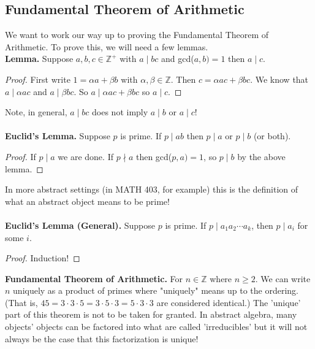 \documentclass[class=article, crop=false]{standalone}
\def\integers{{\mathbb Z}}
\begin{document}
\subsection{Fundamental Theorem of Arithmetic}
We want to work our way up to proving the Fundamental Theorem of Arithmetic. To prove this, we will need a few
lemmas.\\
\textbf{Lemma.} Suppose $a,b,c\in\integers^+$ with $a\mid bc$ and gcd($a,b)=1$ then $a\mid c$.
\begin{proof}
	First write $1=\alpha a+\beta b$ with $\alpha,\beta\in\integers$. Then $c=\alpha ac+ \beta bc$. We know that
	$a\mid \alpha ac$ and $a\mid\beta bc$. So $a\mid\alpha ac+ \beta bc$ so $a\mid c$.
\end{proof}
\noindent Note, in general, $a\mid bc$ does not imply $a\mid b$ or $a\mid c$!\\\\
\textbf{Euclid's Lemma.} Suppose $p$ is prime. If $p\mid ab$ then $p\mid a$ or $p\mid b$ (or both).
\begin{proof}
	If $p\mid a$ we are done. If $p\nmid a$ then gcd($p,a)=1$, so $p\mid b$ by the above lemma.
\end{proof}
\noindent In more abstract settings (in MATH 403, for example) this is the definition of what an abstract object
means to be prime!\\\\
\textbf{Euclid's Lemma (General).} Suppose $p$ is prime. If $p\mid a_1a_2\cdots a_k$, then $p\mid a_i$ for some $i$.
\begin{proof}
	Induction!
\end{proof}
\noindent\textbf{Fundamental Theorem of Arithmetic.} For $n\in\integers$ where $n\geq 2$. We can write $n$ uniquely as a 
product of primes where "uniquely" means up to the ordering. (That is, $45=3\cdot 3\cdot5=3\cdot5\cdot3=5\cdot3\cdot3$ are
considered identical.) The 'unique' part of this theorem is not to be taken for granted. In abstract algebra, many objects'
objects can be factored into what are called 'irreducibles' but it will not always be the case that this factorization is unique!
\end{document}
